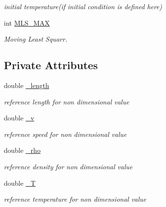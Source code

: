 \begin{CompactItemize}
\begin{CompactList}\small\item\em initial temperature(if initial condition is defined here) \item\end{CompactList}\item 
\hypertarget{classInitiation_4a7f19654a3c5fc2c703796150ab7de5}{
int \hyperlink{classInitiation_4a7f19654a3c5fc2c703796150ab7de5}{MLS\_\-MAX}}
\label{classInitiation_4a7f19654a3c5fc2c703796150ab7de5}

\begin{CompactList}\small\item\em Moving Least Squarr. \item\end{CompactList}\end{CompactItemize}
\subsection*{Private Attributes}
\begin{CompactItemize}
\item 
\hypertarget{classInitiation_18480401f4b40c2830a764cc56085167}{
double \hyperlink{classInitiation_18480401f4b40c2830a764cc56085167}{\_\-length}}
\label{classInitiation_18480401f4b40c2830a764cc56085167}

\begin{CompactList}\small\item\em reference length for non dimensional value \item\end{CompactList}\item 
\hypertarget{classInitiation_0e7baf9e9f15d03c957db7bc1df9e5f0}{
double \hyperlink{classInitiation_0e7baf9e9f15d03c957db7bc1df9e5f0}{\_\-v}}
\label{classInitiation_0e7baf9e9f15d03c957db7bc1df9e5f0}

\begin{CompactList}\small\item\em reference speed for non dimensional value \item\end{CompactList}\item 
\hypertarget{classInitiation_a20ec3ff1ccfd3aaf9505a86c2d629a1}{
double \hyperlink{classInitiation_a20ec3ff1ccfd3aaf9505a86c2d629a1}{\_\-rho}}
\label{classInitiation_a20ec3ff1ccfd3aaf9505a86c2d629a1}

\begin{CompactList}\small\item\em reference density for non dimensional value \item\end{CompactList}\item 
\hypertarget{classInitiation_8dc68dc47e54d0e3bf9ab4a222513c51}{
double \hyperlink{classInitiation_8dc68dc47e54d0e3bf9ab4a222513c51}{\_\-T}}
\label{classInitiation_8dc68dc47e54d0e3bf9ab4a222513c51}

\begin{CompactList}\small\item\em reference temperature for non dimensional value \item\end{CompactList}\end{CompactItemize}
